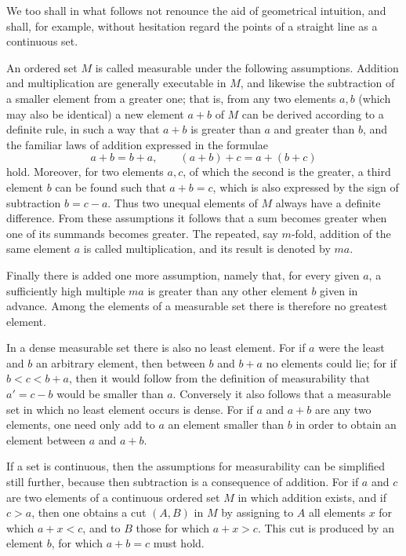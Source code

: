 \documentclass[11pt]{article}
\begin{document}
We too shall in what follows not renounce the aid of geometrical intuition, and shall, for example, without hesitation regard the points of a straight line as a continuous set.

An ordered set $M$ is called measurable under the following assumptions. Addition and multiplication are generally executable in $M$, and likewise the subtraction of a smaller element from a greater one; that is, from any two elements $a,b$ (which may also be identical) a new element $a+b$ of $M$ can be derived according to a definite rule, in such a way that $a+b$ is greater than $a$ and greater than $b$, and the familiar laws of addition expressed in the formulae
\[
 a+b=b+a,
 \qquad (a+b)+c=a+(b+c)
\]
hold. Moreover, for two elements $a,c$, of which the second is the greater, a third element $b$ can be found such that $a+b=c$, which is also expressed by the sign of subtraction $b=c-a$. Thus two unequal elements of $M$ always have a definite difference. From these assumptions it follows that a sum becomes greater when one of its summands becomes greater. The repeated, say $m$-fold, addition of the same element $a$ is called multiplication, and its result is denoted by $ma$.

Finally there is added one more assumption, namely that, for every given $a$, a sufficiently high multiple $ma$ is greater than any other element $b$ given in advance. Among the elements of a measurable set there is therefore no greatest element.

In a dense measurable set there is also no least element. For if $a$ were the least and $b$ an arbitrary element, then between $b$ and $b+a$ no elements could lie; for if $b<c<b+a$, then it would follow from the definition of measurability that $a'=c-b$ would be smaller than $a$. Conversely it also follows that a measurable set in which no least element occurs is dense. For if $a$ and $a+b$ are any two elements, one need only add to $a$ an element smaller than $b$ in order to obtain an element between $a$ and $a+b$.

If a set is continuous, then the assumptions for measurability can be simplified still further, because then subtraction is a consequence of addition. For if $a$ and $c$ are two elements of a continuous ordered set $M$ in which addition exists, and if $c>a$, then one obtains a cut $(A,B)$ in $M$ by assigning to $A$ all elements $x$ for which $a+x<c$, and to $B$ those for which $a+x>c$. This cut is produced by an element $b$, for which $a+b=c$ must hold.
\end{document}
